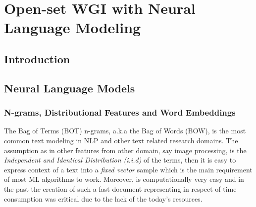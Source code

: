 
\chapter{Open-set WGI with Neural Language Modeling}

\label{chap:word_embeddings}



\newcommand{\keyword}[1]{\textbf{#1}}
\newcommand{\tabhead}[1]{\textbf{#1}}
\newcommand{\code}[1]{\texttt{#1}}
\newcommand{\file}[1]{\texttt{\bfseries#1}}
\newcommand{\option}[1]{\texttt{\itshape#1}}


\section{Introduction}\label{chap:word_embeddings:sec:intro}
 
\section{Neural Language Models}\label{chap:word_embeddings:sec:NLM}

\subsection{N-grams, Distributional Features and Word Embeddings} \label{chap:word_embeddings:sec:ngrans_vs_doc2vec}


The Bag of Terms (BOT) n-grams, a.k.a the Bag of Words (BOW), is the most common text modeling in NLP and other text related research domains. The assumption as in other features from other domain, say image processing, is the \textit{Independent and Identical Distribution (i.i.d)} of the terms, then it is easy to express context of a text into a \textit{fixed vector} sample which is the main requirement of most ML algorithms to work. Moreover, is computationally very easy and in the past the creation of such a fast document representing in respect of time consumption was critical due to the lack of the today's resources.

